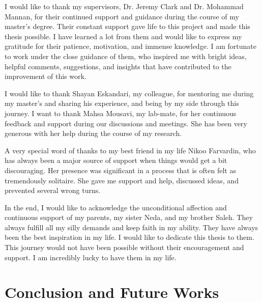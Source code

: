 \documentclass[letterpaper,12pt,onecolumn,final]{report}
\begin{document}
\begin{acknowledgments}
  I would like to thank my supervisors, Dr. Jeremy Clark and Dr. Mohammad Mannan, for their continued support and guidance during the course of my master's degree. Their constant support gave life to this project and made this thesis possible. I have learned a lot from them and would like to express my gratitude for their patience, motivation, and immense knowledge. I am fortunate to work under the close guidance of them, who inspired me with bright ideas, helpful comments, suggestions, and insights that have contributed to the improvement of this work.

  I would like to thank Shayan Eskandari, my colleague, for mentoring me during my master's and sharing his experience, and being by my side through this journey. I want to thank Mahsa Mousavi, my lab-mate, for her continuous feedback and support during our discussions and meetings. She has been very generous with her help during the course of my research.
  
  A very special word of thanks to my best friend in my life Nikoo Farvardin, who has always been a major source of support when things would get a bit discouraging. Her presence was significant in a process that is often felt as tremendously solitaire. She gave me support and help, discussed ideas, and prevented several wrong turns.
  
  In the end, I would like to acknowledge the unconditional affection and continuous support of my parents, my sister Neda, and my brother Saleh. They always fulfill all my silly demands and keep faith in my ability. They have always been the best inspiration in my life. I would like to dedicate this thesis to them. This journey would not have been possible without their encouragement and support. I am incredibly lucky to have them in my life.
\end{acknowledgments}













\chapter{Conclusion and Future Works}
\label{chap:conclusion}
\end{document}
